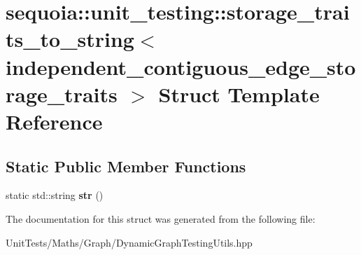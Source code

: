 \hypertarget{structsequoia_1_1unit__testing_1_1storage__traits__to__string_3_01independent__contiguous__edge__storage__traits_01_4}{}\section{sequoia\+::unit\+\_\+testing\+::storage\+\_\+traits\+\_\+to\+\_\+string$<$ independent\+\_\+contiguous\+\_\+edge\+\_\+storage\+\_\+traits $>$ Struct Template Reference}
\label{structsequoia_1_1unit__testing_1_1storage__traits__to__string_3_01independent__contiguous__edge__storage__traits_01_4}
\subsection*{Static Public Member Functions}
\begin{DoxyCompactItemize}
\item 
\mbox{\label{structsequoia_1_1unit__testing_1_1storage__traits__to__string_3_01independent__contiguous__edge__storage__traits_01_4_ac5a7e3be7848a297aa0b1868851ad36d}} 
static std\+::string {\bfseries str} ()
\end{DoxyCompactItemize}


The documentation for this struct was generated from the following file\+:\begin{DoxyCompactItemize}
\item 
Unit\+Tests/\+Maths/\+Graph/Dynamic\+Graph\+Testing\+Utils.\+hpp\end{DoxyCompactItemize}
